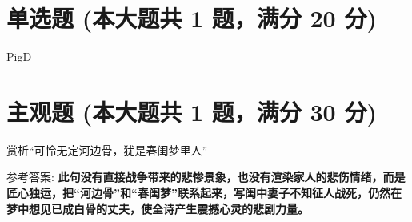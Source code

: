 \documentclass[12pt, a4paper, addpoints, answers]{exam}
\begin{document}
\hspace{5cm}

\section{\normalsize{单选题 (本大题共 1 题，满分 20 分)}}
\hspace{1.5cm}

\begin{questions}
\question[20] PigD

\begin{oneparchoices}
\end{oneparchoices}

\end{questions}

\hspace{5cm}

\section{\normalsize{主观题 (本大题共 1 题，满分 30 分)}}
\hspace{1.5cm}

\begin{questions}
\question[30] 赏析“可怜无定河边骨，犹是春闺梦里人”

参考答案: \textbf{此句没有直接战争带来的悲惨景象，也没有渲染家人的悲伤情绪，而是匠心独运，把“河边骨”和“春闺梦”联系起来，写闺中妻子不知征人战死，仍然在梦中想见已成白骨的丈夫，使全诗产生震撼心灵的悲剧力量。}

\end{questions}
\end{document}

